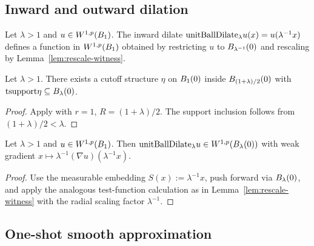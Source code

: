 \subsection*{Inward and outward dilation}

\begin{definition}
\label{def:MemW1pWitness_unitBallDilate}
\leanok
{}
Let $\lambda > 1$ and $u \in W^{1,p}(B_{1})$. The inward dilate
$\mathrm{unitBallDilate}_\lambda u(x) = u(\lambda^{-1}x)$ defines a function in
$W^{1,p}(B_{1})$ obtained by restricting $u$ to $B_{\lambda^{-1}}(0)$
and rescaling by Lemma~\ref{lem:rescale-witness}.
\end{definition}

\begin{theorem}
\label{thm:exists_unitBallCutoff_inside}
\leanok
{}
Let $\lambda > 1$. There exists a cutoff structure $\eta$ on
$B_{1}(0)$ inside $B_{(1+\lambda)/2}(0)$ with
$\mathrm{tsupport} \eta \subseteq B_{\lambda}(0)$.
\end{theorem}

\begin{proof}
\leanok
{}

Apply  with $r=1$, $R=(1+\lambda)/2$. The support
inclusion follows from $(1+\lambda)/2 < \lambda$.
\end{proof}

\begin{lemma}
\label{lem:dilate-large}
\leanok
{}
Let $\lambda > 1$ and $u \in W^{1,p}(B_{1})$. Then
$\mathrm{unitBallDilate}_\lambda u \in W^{1,p}(B_{\lambda}(0))$ with weak
gradient $x \mapsto \lambda^{-1}(\nabla u)(\lambda^{-1}x)$.
\end{lemma}

\begin{proof}
\leanok
{}

Use the measurable embedding $S(x) := \lambda^{-1}x$, push forward via
$B_{\lambda}(0)$, and apply the analogous test-function calculation as
in Lemma~\ref{lem:rescale-witness} with the radial scaling factor
$\lambda^{-1}$.
\end{proof}

\subsection*{One-shot smooth approximation}

